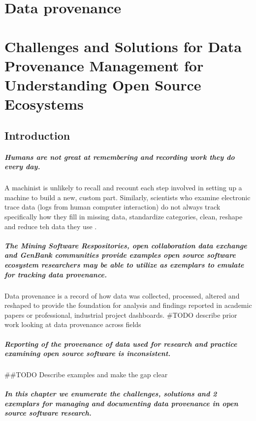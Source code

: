 \chapter{Data provenance}
\chapter*{Challenges and Solutions for Data Provenance Management for Understanding Open Source Ecosystems}
\section{Introduction}
\paragraph{Humans are not great at remembering and recording work they do every day.} A machinist is unlikely to recall and recount each step involved in setting up a machine to build a new, custom part. Similarly, scientists who examine electronic trace data (logs from human computer interaction) do not always track specifically how they fill in missing data, standardize categories, clean, reshape and reduce teh data they use \cite{Goggins et al 2016}. 
\paragraph{The Mining Software Respositories, open collaboration data exchange and GenBank communities provide examples open source software ecosystem researchers may be able to utilize as exemplars to emulate for tracking data provenance.}  Data provenance is a record of how data was collected, processed, altered and reshaped to provide the foundation for analysis and findings reported in academic papers or professional, industrial project dashboards. \#TODO describe prior work looking at data provenance across fields
\paragraph{Reporting of the provenance of data used for research and practice examining open source software is inconsistent.} \#\#TODO Describe examples and make the gap clear
\paragraph{In this chapter we enumerate the challenges, solutions and 2 exemplars for managing and documenting data provenance in open source software research.}
